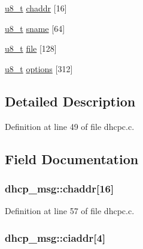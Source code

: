 \begin{DoxyCompactItemize}
\item 
\hyperlink{group__uipfw_ga4caecabca98b43919dd11be1c0d4cd8e}{u8\_\-t} \hyperlink{structdhcp__msg_a424c06ec48d7f5f0e46ad5e408383887}{chaddr} \mbox{[}16\mbox{]}
\item 
\hyperlink{group__uipfw_ga4caecabca98b43919dd11be1c0d4cd8e}{u8\_\-t} \hyperlink{structdhcp__msg_ad203bdcc6153f9f53fa22ed7806c4fd9}{sname} \mbox{[}64\mbox{]}
\item 
\hyperlink{group__uipfw_ga4caecabca98b43919dd11be1c0d4cd8e}{u8\_\-t} \hyperlink{structdhcp__msg_aa8a1d58ec7be4c6380327b434cccaa43}{file} \mbox{[}128\mbox{]}
\item 
\hyperlink{group__uipfw_ga4caecabca98b43919dd11be1c0d4cd8e}{u8\_\-t} \hyperlink{structdhcp__msg_aef4fc68ee8cf7301239b23027981d4a6}{options} \mbox{[}312\mbox{]}
\end{DoxyCompactItemize}


\subsection{Detailed Description}


Definition at line 49 of file dhcpc.c.



\subsection{Field Documentation}
\hypertarget{structdhcp__msg_a424c06ec48d7f5f0e46ad5e408383887}{
\subsubsection[{chaddr}]{ {\bf dhcp\_\-msg::chaddr}\mbox{[}16\mbox{]}}}
\label{structdhcp__msg_a424c06ec48d7f5f0e46ad5e408383887}


Definition at line 57 of file dhcpc.c.

\hypertarget{structdhcp__msg_abc2e31ead334c04b03e115fd6351a2c4}{
\subsubsection[{ciaddr}]{ {\bf dhcp\_\-msg::ciaddr}\mbox{[}4\mbox{]}}}
\label{structdhcp__msg_abc2e31ead334c04b03e115fd6351a2c4}


